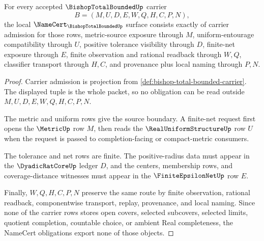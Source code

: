 \begin{theorem}
\label{thm:bishop-total-bounded-namecert-obligations}
For every accepted $\BishopTotalBoundedUp$ carrier
$$
B=(M,U,D,E,W,Q,H,C,P,N),
$$
the local $\NameCert_{\BishopTotalBoundedUp}$ surface consists exactly of carrier admission for those rows, metric-source exposure through $M$, uniform-entourage compatibility through $U$, positive tolerance visibility through $D$, finite-net exposure through $E$, finite observation and rational readback through $W,Q$, classifier transport through $H,C$, and provenance plus local naming through $P,N$.
\end{theorem}
\begin{proof}
Carrier admission is projection from \autoref{def:bishop-total-bounded-carrier}. The displayed tuple is the whole packet, so no obligation can be read outside $M,U,D,E,W,Q,H,C,P,N$.

The metric and uniform rows give the source boundary. A finite-net request first opens the $\MetricUp$ row $M$, then reads the $\RealUniformStructureUp$ row $U$ when the request is passed to completion-facing or compact-metric consumers.

The tolerance and net rows are finite. The positive-radius data must appear in the $\DyadicRatCoreUp$ ledger $D$, and the centers, membership rows, and coverage-distance witnesses must appear in the $\FiniteEpsilonNetUp$ row $E$.

Finally, $W,Q,H,C,P,N$ preserve the same route by finite observation, rational readback, componentwise transport, replay, provenance, and local naming. Since none of the carrier rows stores open covers, selected subcovers, selected limits, quotient completion, countable choice, or ambient Real completeness, the NameCert obligations export none of those objects.
\end{proof}

